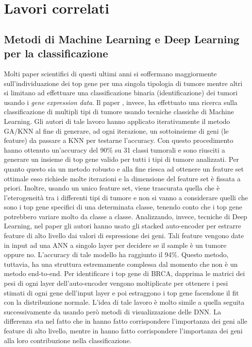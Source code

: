 \section{Lavori correlati}
\label{sec:relwork}
\subsection{Metodi di Machine Learning e Deep Learning per la classificazione}
Molti paper scientifici di questi ultimi anni si soffermano maggiormente sull'individuazione dei top gene per una singola
tipologia di tumore mentre altri si limitano ad effettuare una classificazione binaria (identificazione) dei
tumori usando i \textit{gene expression data}. Il paper \cite{li2017comprehensive}, invece, ha effettuato una ricerca
sulla classificazione di multipli tipi di tumore usando tecniche classiche di Machine Learning. 
Gli autori di tale lavoro hanno applicato iterativamente il metodo
GA/KNN al fine di generare, ad ogni iterazione, un sottoinsieme di geni (le feature) da passare a KNN per testarne
l'accuracy. Con questo procedimento hanno ottenuto un'accuracy del 90\% su 31 classi tumorali e sono riusciti a generare
un insieme di top gene valido per tutti i tipi di tumore analizzati. Per quanto questo sia un metodo robusto
e alla fine riesca ad ottenere un feature set ottimale esso richiede molte iterazioni e la dimensione del feature 
set è fissata a priori. Inoltre, usando un unico feature set, viene trascurata quella che è
l'eterogeneità tra i differenti tipi di tumore e non si vanno a considerare quelli che sono i top gene specifici di
una determinata classe, tenendo conto che i top gene potrebbero variare molto da classe a classe.
Analizzando, invece, tecniche di Deep Learning, nel paper \cite{danaee2017deep} gli autori hanno usato gli
stacked auto-encoder per estrarre feature di alto livello dai valori di espressione dei geni. Tali feature
vengono date in input ad una ANN a singolo layer per decidere se il sample è un tumore oppure no. L'accuracy di
tale modello ha raggiunto il 94\%. Questo metodo, tuttavia, ha una struttura estremamente complessa dal momento
che non è un metodo end-to-end. Per identificare i top gene di BRCA, dapprima le matrici dei pesi di ogni layer
dell'auto-encoder vengono moltiplicate per ottenere i pesi stimati di ogni gene dell'input layer e poi estraggono
i top gene facendone il fit con la distribuzione normale.
L'idea di tale lavoro è molto simile a quella seguita successivamente da \cite{lyu2018deep} usando però metodi
di visualizzazione delle DNN. La differenza sta nel fatto che in \cite{danaee2017deep} hanno fatto corrispondere
l'importanza dei geni alle feature di alto livello, mentre in \cite{lyu2018deep} hanno fatto corrispondere l'importanza
dei geni alla loro contribuzione nella classificazione.

